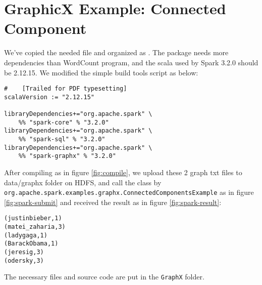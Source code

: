 \section{GraphicX Example: Connected Component}

We've copied the needed file and organized as \cite{xmu-spark}. The package needs more dependencies than WordCount program, and the scala used by Spark 3.2.0 should be 2.12.15. We modified the simple build tools script as below:

\begin{verbatim}
#    [Trailed for PDF typesetting]
scalaVersion := "2.12.15"

libraryDependencies+="org.apache.spark" \
    %% "spark-core" % "3.2.0"
libraryDependencies+="org.apache.spark" \
    %% "spark-sql" % "3.2.0"
libraryDependencies+="org.apache.spark" \ 
    %% "spark-graphx" % "3.2.0"
\end{verbatim}

After compiling as in figure \ref{fig:compile}, we upload these 2 graph txt files to data/graphx folder on HDFS, and call the class by \texttt{org.\allowbreak{}apache.\allowbreak{}spark.\allowbreak{}examples.\allowbreak{}graphx.\allowbreak{}ConnectedComponentsExample} as in figure \ref{fig:spark-submit} and received the result as in figure \ref{fig:spark-result}:

\begin{verbatim}
(justinbieber,1)
(matei_zaharia,3)
(ladygaga,1)
(BarackObama,1)
(jeresig,3)
(odersky,3)
\end{verbatim}

The necessary files and source code are put in the \texttt{GraphX} folder.